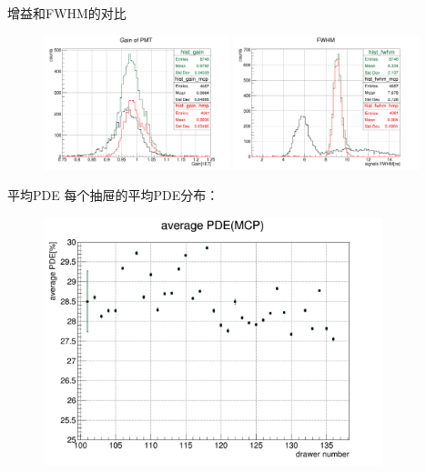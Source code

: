 \documentclass[11pt,compress,xcolor=x11names,UTF8]{beamer}
\begin{document}
\begin{frame}{增益和FWHM的对比}
\begin{figure}
\centering
\includegraphics[width=0.48\textwidth]{gain}
\includegraphics[width=0.48\textwidth]{fwhm}
\end{figure}
\end{frame}
\begin{frame}{平均PDE}
每个抽屉的平均PDE分布：
\begin{figure}
\centering
\includegraphics[width=0.88\textwidth]{dpde}
\end{figure}
\end{frame}
\end{document}
